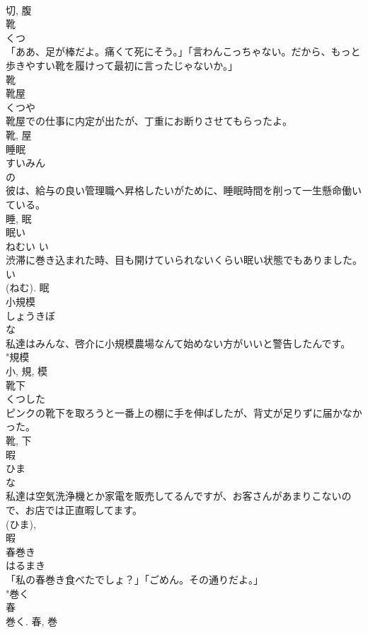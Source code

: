 \documentclass[8pt]{extreport}
\begin{document}
\begin{CJK}{UTF8}{min}
\\	切, 腹	
\\	靴	
\\	くつ	
\\	「ああ、足が棒だよ。痛くて死にそう。」「言わんこっちゃない。だから、もっと歩きやすい靴を履けって最初に言ったじゃないか。」	
\\	靴	
\\	靴屋	
\\	くつや	
\\	靴屋での仕事に内定が出たが、丁重にお断りさせてもらったよ。	
\\	靴, 屋	
\\	睡眠	
\\	すいみん	
\\	の 
\\	彼は、給与の良い管理職へ昇格したいがために、睡眠時間を削って一生懸命働いている。	
\\	睡, 眠	
\\	眠い	
\\	ねむい	い 
\\	渋滞に巻き込まれた時、目も開けていられないくらい眠い状態でもありました。	
\\	い 
\\	(ねむ).	眠	
\\	小規模	
\\	しょうきぼ	
\\	な 
\\	私達はみんな、啓介に小規模農場なんて始めない方がいいと警告したんです。	
\\	"規模 
\\	小, 規, 模	
\\	靴下	
\\	くつした	
\\	ピンクの靴下を取ろうと一番上の棚に手を伸ばしたが、背丈が足りずに届かなかった。	
\\	靴, 下	
\\	暇	
\\	ひま	
\\	な 
\\	私達は空気洗浄機とか家電を販売してるんですが、お客さんがあまりこないので、お店では正直暇してます。	
\\	(ひま), 
\\	暇	
\\	春巻き	
\\	はるまき	
\\	「私の春巻き食べたでしょ？」「ごめん。その通りだよ。」	
\\	"巻く 
\\	春 
\\	巻く.	春, 巻	

\end{CJK}
\end{document}
